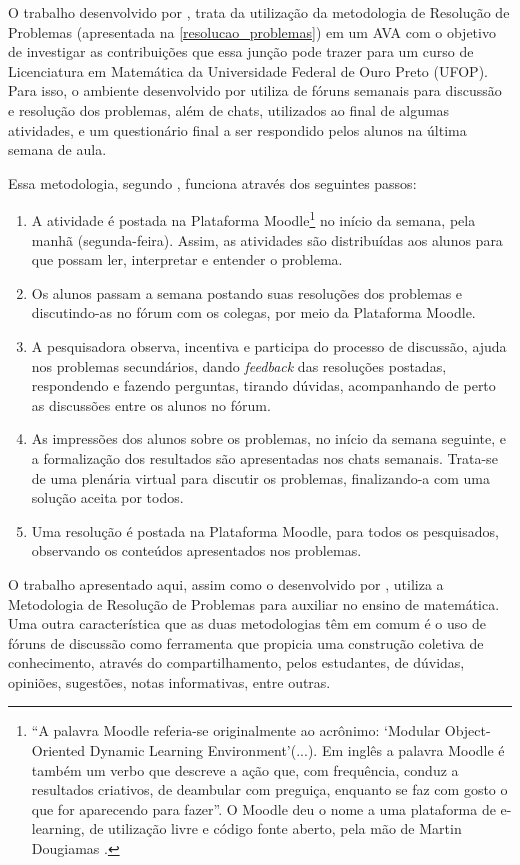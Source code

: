O trabalho desenvolvido por , trata da utilização da metodologia de Resolução de Problemas (apresentada na \autoref{resolucao_problemas}) em um AVA com o objetivo de 
investigar as contribuições que essa jun\c{c}\~ao pode trazer para um curso de Licenciatura em Matem\'atica da Universidade Federal de Ouro Preto (UFOP). Para isso, 
o ambiente desenvolvido por  utiliza de fóruns semanais para discussão e resolução dos problemas, além de chats, utilizados ao final de algumas atividades, e um 
questionário final a ser respondido pelos alunos na última semana de aula.

Essa metodologia, segundo , funciona atrav\'es dos seguintes passos:
\begin{enumerate}
	\item A atividade é postada na Plataforma Moodle\footnote{``A  palavra  Moodle  referia-se  originalmente  ao  acrônimo:  `Modular Object-Oriented  Dynamic  Learning  Environment'(...).  Em  inglês  a  palavra Moodle é também um verbo que descreve a ação que, com frequência, conduz a resultados criativos, de deambular com preguiça, enquanto se faz com gosto o  que  for  aparecendo  para  fazer''. O  Moodle  deu  o  nome  a  uma  plataforma  de  e-learning,  de  utilização livre  e  código  fonte  aberto,  pela  mão  de  Martin  Dougiamas \cite{oro29585}.} no início da semana, pela manhã (segunda-feira).  Assim,  as  atividades  são  distribuídas  aos  alunos  para  que possam ler, interpretar e entender o problema. 
	\item Os  alunos  passam a  semana  postando  suas  resoluções  dos  problemas e discutindo-as no fórum com os colegas, por meio da Plataforma Moodle. 
	\item A  pesquisadora  observa,  incentiva  e  participa  do  processo  de discussão, ajuda nos problemas secundários, dando \textit{feedback} das resoluções postadas, respondendo e fazendo 
perguntas, tirando  dúvidas, acompanhando de perto as discussões entre os alunos no fórum.
	\item As impressões dos alunos sobre os problemas, no início da semana seguinte, e a formalização dos resultados são apresentadas nos chats semanais. Trata-se  de  uma  plenária  virtual  para  discutir  os  problemas,  finalizando-a  com  uma solução aceita por todos. 
	\item Uma resolução é postada na Plataforma Moodle, para todos os pesquisados, observando os conteúdos apresentados nos problemas. 
\end{enumerate}

O trabalho apresentado aqui, assim como o desenvolvido por , utiliza a Metodologia de Resolu\c{c}\~ao de Problemas para auxiliar no ensino de matem\'atica. Uma 
outra característica que as duas metodologias t\^em em comum \'e o uso de f\'oruns de discuss\~ao como ferramenta que propicia uma constru\c{c}\~ao coletiva de conhecimento, atrav\'es do 
compartilhamento, pelos estudantes, de d\'uvidas, opini\~oes, sugest\~oes, notas informativas, entre outras.